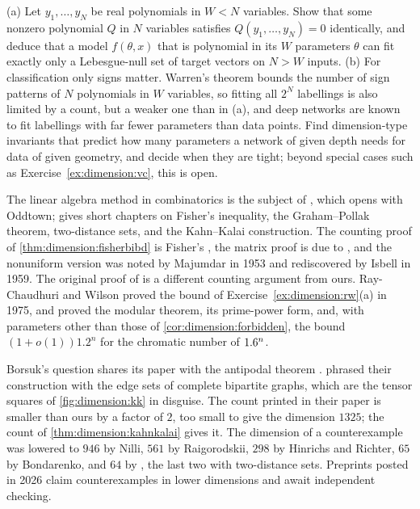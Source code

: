 \begin{refsection}
\begin{exercises}
\item \research\harder (a) Let $y_1,\dots,y_N$ be real polynomials in $W<N$ variables. Show that some nonzero polynomial $Q$ in $N$ variables satisfies $Q(y_1,\dots,y_N)=0$ identically, and deduce that a model $f(\theta,x)$ that is polynomial in its $W$ parameters $\theta$ can fit exactly only a Lebesgue-null set of target vectors on $N>W$ inputs.  (b) For classification only signs matter. Warren's theorem bounds the number of sign patterns of $N$ polynomials in $W$ variables, so fitting all $2^N$ labellings is also limited by a count, but a weaker one than in (a), and deep networks are known to fit labellings with far fewer parameters than data points. Find dimension-type invariants that predict how many parameters a network of given depth needs for data of given geometry, and decide when they are tight; beyond special cases such as Exercise~\ref{ex:dimension:vc}, this is open.\label{ex:dimension:memorization}
\end{exercises}

\notesandrefs
The linear algebra method in combinatorics is the subject of \textcite{BabaiFrankl1992}, which opens with Oddtown; \textcite{Matousek2010} gives short chapters on Fisher's inequality, the Graham--Pollak theorem, two-distance sets, and the Kahn--Kalai construction. The counting proof of \cref{thm:dimension:fisherbibd} is Fisher's \parencite{Fisher1940}, the matrix proof is due to \textcite{Bose1949}, and the nonuniform version was noted by Majumdar in 1953 and rediscovered by Isbell in 1959. The original proof of \textcite{deBruijnErdos1948} is a different counting argument from ours. Ray-Chaudhuri and Wilson proved the bound of Exercise~\ref{ex:dimension:rw}(a) in 1975, and \textcite{FranklWilson1981} proved the modular theorem, its prime-power form, and, with parameters other than those of \cref{cor:dimension:forbidden}, the bound $(1+o(1))1.2^n$ for the chromatic number of $1.6^n$.

Borsuk's question shares its paper with the antipodal theorem \parencite{Borsuk1933}. \textcite{KahnKalai1993} phrased their construction with the edge sets of complete bipartite graphs, which are the tensor squares of \cref{fig:dimension:kk} in disguise. The count printed in their paper is smaller than ours by a factor of $2$, too small to give the dimension $1325$; the count of \cref{thm:dimension:kahnkalai} gives it. The dimension of a counterexample was lowered to $946$ by Nilli, $561$ by Raigorodskii, $298$ by Hinrichs and Richter, $65$ by Bondarenko, and $64$ by \textcite{JenrichBrouwer2014}, the last two with two-distance sets. Preprints posted in 2026 claim counterexamples in lower dimensions and await independent checking.


\end{refsection}
